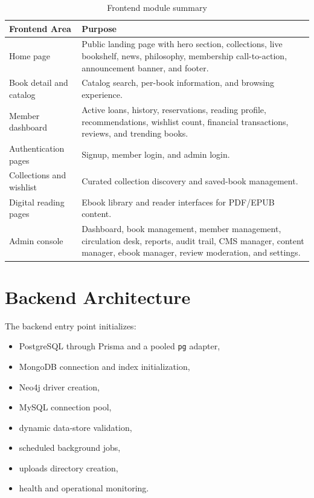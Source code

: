 \documentclass[12pt,a4paper]{report}
\begin{document}
\begin{table}[h!]
\centering
\begin{tabularx}{\textwidth}{p{} X}
\toprule
\textbf{Frontend Area} & \textbf{Purpose} \\
\midrule
Home page & Public landing page with hero section, collections, live bookshelf, news, philosophy, membership call-to-action, announcement banner, and footer. \\
Book detail and catalog & Catalog search, per-book information, and browsing experience. \\
Member dashboard & Active loans, history, reservations, reading profile, recommendations, wishlist count, financial transactions, reviews, and trending books. \\
Authentication pages & Signup, member login, and admin login. \\
Collections and wishlist & Curated collection discovery and saved-book management. \\
Digital reading pages & Ebook library and reader interfaces for PDF/EPUB content. \\
Admin console & Dashboard, book management, member management, circulation desk, reports, audit trail, CMS manager, content manager, ebook manager, review moderation, and settings. \\
\bottomrule
\end{tabularx}
\caption{Frontend module summary}
\end{table}

\section{Backend Architecture}
The backend entry point initializes:
\begin{itemize}[leftmargin=1.5em]
    \item PostgreSQL through Prisma and a pooled \texttt{pg} adapter,
    \item MongoDB connection and index initialization,
    \item Neo4j driver creation,
    \item MySQL connection pool,
    \item dynamic data-store validation,
    \item scheduled background jobs,
    \item uploads directory creation,
    \item health and operational monitoring.
\end{itemize}
\end{document}
